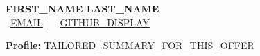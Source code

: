 \begin{center}
    \textbf{\Huge \scshape FIRST_NAME LAST_NAME} \\ \vspace{2pt}
    \small \faEnvelope\ \href{mailto:EMAIL}{EMAIL}\ $|$\
    \faGithub\ \href{GITHUB_URL}{GITHUB_DISPLAY}
\end{center}

\vspace{4pt}
\textbf{Profile:} TAILORED_SUMMARY_FOR_THIS_OFFER

\vspace{2pt}
